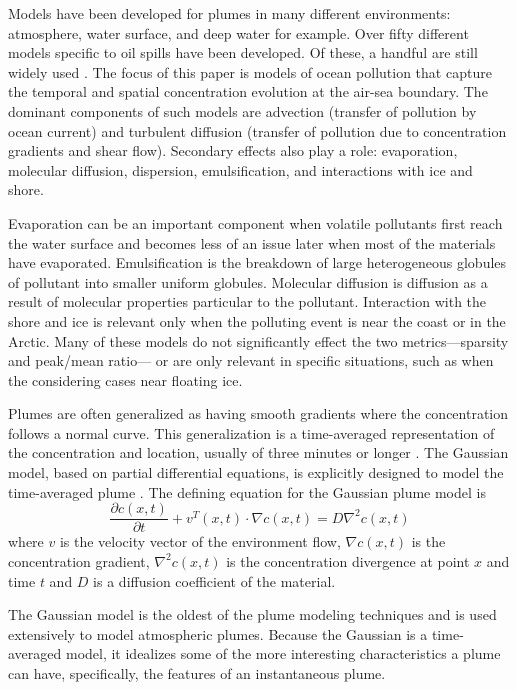 \documentclass[ letterpaper, 10 pt, conference]{ieeeconf}  %
\begin{document}
Models have been developed for plumes in many different environments: atmosphere, water surface, and deep water for example.  Over fifty different models specific to oil spills have been developed. Of these, a handful are still widely used \cite{ASCE1996}.   The focus of this paper is models of ocean pollution that capture the temporal and spatial concentration evolution at the air-sea boundary.  The dominant components of such models are advection (transfer of pollution by ocean current) and turbulent diffusion (transfer of pollution due to concentration gradients and shear flow). Secondary effects also play a role:  evaporation, molecular diffusion, dispersion, emulsification, and interactions with ice and shore. 

Evaporation can be an important component when volatile pollutants %
first reach the water surface and becomes less of an issue later when most of the materials have evaporated.  Emulsification is the breakdown of large heterogeneous globules of pollutant into smaller uniform globules.  
Molecular diffusion is diffusion as a result of molecular properties particular to the pollutant.  
Interaction with the shore and ice is relevant only when the polluting event is near the coast or in the Arctic.
Many of these models do not significantly effect the two metrics---sparsity and peak/mean ratio--- or are only relevant in specific situations, such as when the considering cases near floating ice.  


Plumes are often generalized as having smooth gradients where the concentration follows a normal curve.  This generalization is a time-averaged representation of the concentration and location, usually of three minutes or longer \cite{Jones1983}.  The Gaussian model, based on partial differential equations, is explicitly designed to model the time-averaged plume \cite{Elkinton1984}.  The defining equation for the Gaussian plume model is
	\begin{equation}\label{eq:OrigPlume}
	\frac{\partial c(x,t)}{\partial t} + v^{T}(x,t)\cdot \nabla c(x,t) = D\nabla^2 c(x,t)
	\end{equation}
where $v$ is the velocity vector of the environment flow, $\nabla c(x,t)$ is the concentration gradient, $\nabla^2 c(x,t)$ is the concentration divergence at point $x$ and time $t$ and $D$ is a diffusion coefficient of the material.

The Gaussian model is the oldest of the plume modeling techniques and is used extensively to model atmospheric plumes. Because the Gaussian is a time-averaged model, it idealizes some of the more interesting characteristics a plume can have, specifically, the features of an instantaneous plume. 
\end{document}
